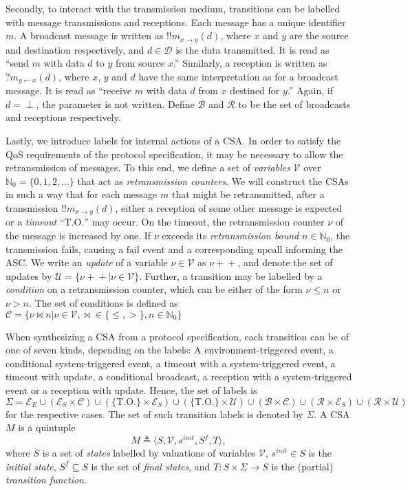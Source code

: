 \documentclass{sig-alternate}
\newcommand{\D}{\mathcal{D}}
\newcommand{\B}{\mathcal{B}}
\newcommand{\R}{\mathcal{R}}
\newcommand{\U}{\mathcal{U}}
\newcommand{\C}{\mathcal{C}}
\newcommand{\SE}{\mathcal{E}_S}
\newcommand{\EE}{\mathcal{E}_E}
\newcommand{\V}{\mathcal{V}}
\newcommand{\timeout}{\mathrm{T.O.}}
\newcommand{\locev}[1]{\underline{#1}}
\newcommand{\fail}{\locev{\mathrm{fail}}}
\newcommand{\define}{\sl}
\begin{document}
Secondly, to interact with the transmission medium, transitions can be labelled with message transmissions and receptions. Each message has a unique identifier $m$. A broadcast message is written as $!!m_{x \rightarrow y}(d)$, where $x$ and $y$ are the source and destination respectively, and $d \in \D$ is the data transmitted. It is read as ``send $m$ with data $d$ to $y$ from source $x$.'' Similarly, a reception is written as $?m_{y \leftarrow x}(d)$, where $x$, $y$ and $d$ have the same interpretation as for a broadcast message. It is read as ``receive $m$ with data $d$ from $x$ destined for $y$.'' Again, if $d = \perp$, the parameter is not written. Define $\B$ and $\R$ to be the set of broadcasts and receptions respectively.

Lastly, we introduce labels for internal actions of a CSA. In order to satisfy the QoS requirements of the protocol specification, it may be necessary to allow the retransmission of messages. To this end, we define a set of {\define variables} $\V$ over $\mathbb{N}_0 = \{0, 1, 2, \ldots \}$ that act as {\define retransmission counters}. We will construct the CSAs in such a way that for each message $m$ that might be retransmitted, after a transmission $!!m_{x \rightarrow y}(d)$, either a reception of some other message is expected or a {\define timeout} ``$\timeout$'' may occur. On the timeout, the retransmission counter $\nu$ of the message is increased by one. If $\nu$ exceeds its {\define retransmission bound} $n \in \mathbb{N}_0$, the transmission fails, causing a $\fail$ event and a corresponding upcall informing the ASC. We write an {\define update} of a variable $\nu \in \V$ as $\nu\!+\!+$, and denote the set of updates by $\U = \{ \nu\!+\!+ | \nu \in \V\}$. Further, a transition may be labelled by a {\define condition} on a retransmission counter, which can be either of the form $\nu \leq n$ or $\nu > n$. The set of conditions is defined as $\C = \{\nu \bowtie n | \nu \in \V, \bowtie \in \{ \leq, > \}, n \in \mathbb{N}_0 \}$

When synthesizing a CSA from a protocol specification, each transition can be of one of seven kinds, depending on the labels: A environment-triggered event, a conditional system-triggered event, a timeout with a system-triggered event, a timeout with update, a conditional broadcast, a reception with a system-triggered event or a reception with update. Hence, the set of labels is $\Sigma = \EE \cup (\SE \times \C) \cup (\{\timeout\} \times \SE) \cup (\{\timeout\} \times \U) \cup (\B \times \C) \cup (\R \times \SE)  \cup (\R \times \U)$ for the respective cases. The set of such transition labels is denoted by $\Sigma$. A CSA $M$ is a quintuple
\begin{equation*}
	M \triangleq \langle S, \V, s^{init}, S^f, T \rangle,
\end{equation*}
where $S$ is a set of {\define states} labelled by valuations of variables $\V$, $s^{init} \in S$ is the {\define initial state}, $S^f \subseteq S$ is the set of {\define final states}, and $T : S \times \Sigma \rightarrow S$ is the (partial) {\define transition function}.
\end{document}

